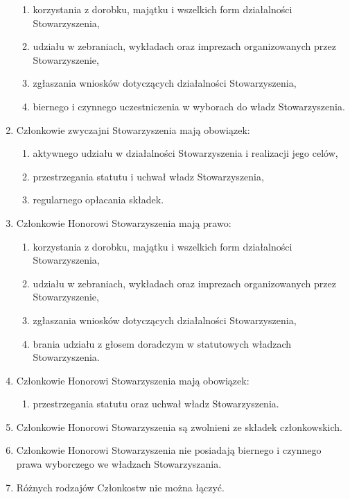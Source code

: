\documentclass{article}
\begin{document}
\begin{enumerate}
      \begin{enumerate}
        \item korzystania z dorobku, majątku i wszelkich form działalności Stowarzyszenia,
        \item udziału w zebraniach, wykładach oraz imprezach organizowanych przez Stowarzyszenie,
        \item zgłaszania wniosków dotyczących działalności Stowarzyszenia,
        \item biernego i czynnego uczestniczenia w wyborach do władz Stowarzyszenia.
      \end{enumerate}
    \item Członkowie zwyczajni Stowarzyszenia mają obowiązek:
      \begin{enumerate}
        \item aktywnego udziału w działalności Stowarzyszenia i realizacji jego celów,
        \item przestrzegania statutu i uchwał władz Stowarzyszenia,
        \item regularnego opłacania składek.
      \end{enumerate}
    \item Członkowie Honorowi Stowarzyszenia mają prawo:
      \begin{enumerate}
        \item korzystania z dorobku, majątku i wszelkich form działalności Stowarzyszenia,
        \item udziału w zebraniach, wykładach oraz imprezach organizowanych przez Stowarzyszenie,
        \item zgłaszania wniosków dotyczących działalności Stowarzyszenia,
        \item brania udziału z głosem doradczym w statutowych władzach Stowarzyszenia.
      \end{enumerate}
    \item Członkowie Honorowi Stowarzyszenia mają obowiązek:
      \begin{enumerate}
        \item przestrzegania statutu oraz uchwał władz Stowarzyszenia.
      \end{enumerate}
    \item Członkowie Honorowi Stowarzyszenia są zwolnieni ze składek członkowskich.
    \item Członkowie Honorowi Stowarzyszenia nie posiadają biernego i czynnego prawa wyborczego we władzach Stowarzyszania.
    \item Różnych rodzajów Członkostw nie można łączyć.

\end{enumerate}
\end{document}
